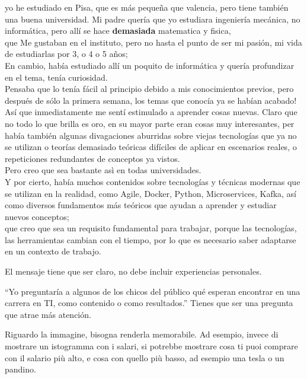 yo he estudiado en Pisa, que es más pequeña que valencia, pero tiene también una buena universidad. 
Mi padre quería que yo estudiara ingeniería mecánica, no informática, pero allí se hace \textbf{demasiada} matematica y fisica,\\
que Me gustaban en el instituto, pero no hasta el punto de ser mi pasión, mi vida de estudiarlas por 3, o 4 o 5 años;\\
En cambio, había estudiado allí un poquito de informática y quería profundizar en el tema, tenía curiosidad.\\
Pensaba que lo tenía fácil al principio debido a mis conocimientos previos, pero después de sólo la primera semana, los temas que conocía ya se habían acabado!\\
Así que inmediatamente me sentí estimulado a aprender cosas nuevas. Claro que no todo lo que brilla es oro, en su mayor parte eran cosas muy interesantes, per había también algunas divagaciones aburridas sobre viejas tecnologías que ya no se utilizan o teorías demasiado teóricas difíciles de aplicar en escenarios reales, o repeticiones redundantes de conceptos ya vistos.\\
Pero creo que sea bastante asì en todas universidades.\\
Y por cierto, había muchos contenidos sobre tecnologías y técnicas modernas que se utilizan en la realidad, como Agile, Docker, Python, Microservices, Kafka, así como diversos fundamentos más teóricos que ayudan a aprender y estudiar nuevos conceptos;\\
que creo que sea un requisito fundamental para trabajar, porque las tecnologías, las herramientas cambian con el tiempo, por lo que es necesario saber adaptarse en un contexto de trabajo.



El mensaje tiene que ser claro, no debe incluir experiencias personales.

``Yo preguntaría a algunos de los chicos del público qué esperan encontrar en una carrera en TI, como contenido o como resultados.''
Tienes que ser una pregunta que atrae más atención.

Riguardo la immagine, bisogna renderla memorabile. Ad esempio, invece di mostrare un istogramma con i salari, si potrebbe mostrare cosa ti puoi comprare con il salario più alto, e cosa con quello più basso, ad esempio una tesla o un pandino.